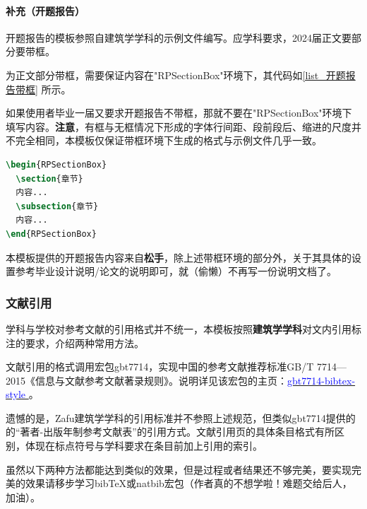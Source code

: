 \documentclass[AutoFakeBold]{ZafuThesis}
\begin{document}
\paragraph{补充（开题报告）}
开题报告的模板参照自建筑学学科的示例文件编写。应学科要求，2024届正文要部分要带框。\par
为正文部分带框，需要保证内容在"RPSectionBox"环境下，其代码如\ref{list_开题报告带框} 所示。\par
如果使用者毕业一届又要求开题报告不带框，那就不要在"RPSectionBox"环境下填写内容。\textbf{注意}，有框与无框情况下形成的字体行间距、段前段后、缩进的尺度并不完全相同，本模板仅保证带框环境下生成的格式与示例文件几乎一致。
\begin{lstlisting}[caption=开题报告带框, label = list_开题报告带框,language = tex]
\begin{RPSectionBox}
  \section{章节}
  内容...
  \subsection{章节}
  内容...
\end{RPSectionBox}
\end{lstlisting}\par
本模板提供的开题报告内容来自\textbf{松手}，除上述带框环境的部分外，关于其具体的设置参考毕业设计说明/论文的说明即可，就（偷懒）不再写一份说明文档了。

\subsubsection{文献引用}
学科与学校对参考文献的引用格式并不统一，本模板按照\textbf{建筑学学科}对文内引用标注的要求，介绍两种常用方法。\par
文献引用的格式调用宏包gbt7714，实现中国的参考文献推荐标准GB/T 7714—2015《信息与文献参考文献著录规则》。说明详见该宏包的主页：\href{https://github.com/zepinglee/gbt7714-bibtex-style}{\textcolor{blue}{gbt7714-bibtex-style
}}。\par
遗憾的是，Zafu建筑学学科的引用标准并不参照上述规范，但类似gbt7714提供的的“著者-出版年制参考文献表”的引用方式。文献引用页的具体条目格式有所区别，体现在标点符号与学科要求在条目前加上引用的索引。\par
虽然以下两种方法都能达到类似的效果，但是过程或者结果还不够完美，要实现完美的效果请移步学习bibTeX或natbib宏包（作者真的不想学啦！难题交给后人，加油）。
\end{document}
